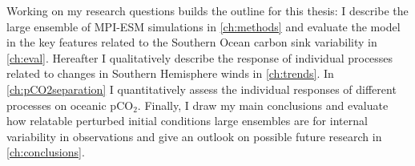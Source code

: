 \vspace{15mm}
Working on my research questions builds the outline for this thesis: 
I describe the large ensemble of \acs{MPI-ESM} simulations in \autoref{ch:methods} and evaluate the model in the key features related to the Southern Ocean carbon sink variability in \autoref{ch:eval}. Hereafter I qualitatively describe the response of individual processes related to changes in Southern Hemisphere winds in \autoref{ch:trends}. %
In \autoref{ch:pCO2separation} I quantitatively assess the individual responses of different processes on oceanic pCO$_2$.  Finally,  I draw my main conclusions and %
evaluate how relatable perturbed initial conditions large ensembles are for internal variability in observations and give an outlook on possible future research in \autoref{ch:conclusions}.\newline %



%

\nocite{WilliamsFollows2011}
